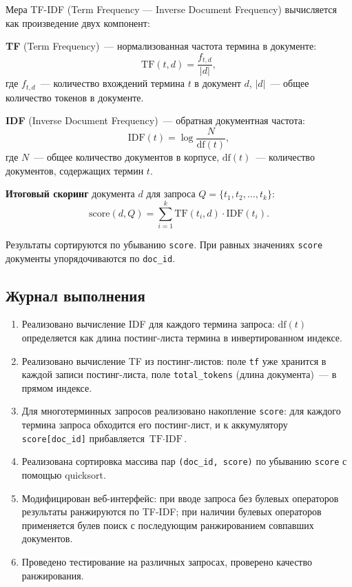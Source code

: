 \documentclass[a4paper,12pt]{article}
\begin{document}
Мера TF-IDF (Term Frequency --- Inverse Document Frequency) вычисляется как произведение двух компонент:

\textbf{TF} (Term Frequency)~--- нормализованная частота термина в документе:
\[
    \text{TF}(t, d) = \frac{f_{t,d}}{|d|},
\]
где $f_{t,d}$~--- количество вхождений термина $t$ в документ $d$, $|d|$~--- общее количество токенов в документе.

\textbf{IDF} (Inverse Document Frequency)~--- обратная документная частота:
\[
    \text{IDF}(t) = \log\frac{N}{\text{df}(t)},
\]
где $N$~--- общее количество документов в корпусе, $\text{df}(t)$~--- количество документов, содержащих термин $t$.

\textbf{Итоговый скоринг} документа $d$ для запроса $Q = \{t_1, t_2, \ldots, t_k\}$:
\[
    \text{score}(d, Q) = \sum_{i=1}^{k} \text{TF}(t_i, d) \cdot \text{IDF}(t_i).
\]

Результаты сортируются по убыванию \texttt{score}. При равных значениях \texttt{score} документы упорядочиваются по \texttt{doc\_id}.

\subsection{Журнал выполнения}

\begin{enumerate}
    \item Реализовано вычисление IDF для каждого термина запроса: $\text{df}(t)$ определяется как длина постинг-листа термина в инвертированном индексе.
    \item Реализовано вычисление TF из постинг-листов: поле \texttt{tf} уже хранится в каждой записи постинг-листа, поле \texttt{total\_tokens} (длина документа)~--- в прямом индексе.
    \item Для многотерминных запросов реализовано накопление \texttt{score}: для каждого термина запроса обходится его постинг-лист, и к аккумулятору \texttt{score[doc\_id]} прибавляется $\text{TF} \cdot \text{IDF}$.
    \item Реализована сортировка массива пар \texttt{(doc\_id, score)} по убыванию \texttt{score} с помощью quicksort.
    \item Модифицирован веб-интерфейс: при вводе запроса без булевых операторов результаты ранжируются по TF-IDF; при наличии булевых операторов применяется булев поиск с последующим ранжированием совпавших документов.
    \item Проведено тестирование на различных запросах, проверено качество ранжирования.
\end{enumerate}
\end{document}
